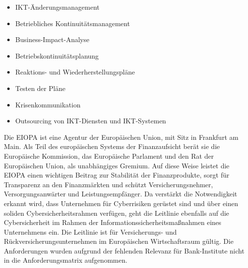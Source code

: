 \begin{itemize}
\begin{itemize}
            \item IKT-Änderungsmanagement   
            \item Betriebliches Kontinuitätsmanagement   
            \item Business-Impact-Analyse   
            \item Betriebskontinuitätsplanung   
            \item Reaktions- und Wiederherstellungspläne   
            \item Testen der Pläne 
            \item Krisenkommunikation   
            \item Outsourcing von IKT-Diensten und IKT-Systemen
        \end{itemize}
\end{itemize}
\bigbreak
Die EIOPA ist eine Agentur der Europäischen Union, mit Sitz in Frankfurt am Main. Als Teil des europäischen Systems der Finanzaufsicht berät sie die Europäische Kommission, das Europäische Parlament und den Rat der Europäischen Union, als unabhängiges Gremium. Auf diese Weise leistet die EIOPA einen wichtigen Beitrag zur Stabilität der Finanzprodukte, sorgt für Transparenz an den Finanzmärkten und schützt Versicherungsnehmer, Versorgungsanwärter und Leistungsempfänger. Da verstärkt die Notwendigkeit erkannt wird, dass Unternehmen für Cyberrisiken gerüstet sind und über einen soliden Cybersicherheitsrahmen verfügen, geht die Leitlinie ebenfalls auf die Cybersicherheit im Rahmen der Informationssicherheitsmaßnahmen eines Unternehmens ein. Die Leitlinie ist für Versicherungs- und Rückversicherungsunternehmen im Europäischen Wirtschaftsraum gültig. Die Anforderungen wurden aufgrund der fehlenden Relevanz für Bank-Institute nicht in die Anforderungsmatrix aufgenommen. \autocite{EIOPA} 


